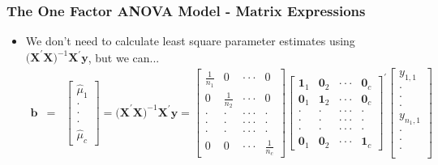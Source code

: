     \begin{frame}[shrink=10]
 \frametitle{The One Factor ANOVA Model - Matrix Expressions}
   \begin{itemize}
    \item We don't need to calculate least square parameter
    estimates using $\mathbf{(X}^{\prime }\mathbf{X)}^{-1}\mathbf{X}^{\prime
    }\mathbf{y}$, but we can...
\begin{eqnarray*}
\mathbf{b} &=&%
\begin{bmatrix}
\hat{\mu}_{1} \\
\cdot  \\
\cdot  \\
\cdot  \\
\hat{\mu}_{c}%
\end{bmatrix}%
=\mathbf{(X}^{\prime }\mathbf{X)}^{-1}\mathbf{X}^{\prime }\mathbf{y}=%
\begin{bmatrix}
\frac{1}{n_1} & 0 & \cdot \cdot \cdot  & 0 \\
0 & \frac{1}{n_2} & \cdot \cdot \cdot  & 0 \\
\cdot  & \cdot  & \cdot \cdot \cdot  & \cdot  \\
\cdot  & \cdot  & \cdot \cdot \cdot  & \cdot  \\
\cdot  & \cdot  & \cdot \cdot \cdot  & \cdot  \\
0 & 0 & \cdot \cdot \cdot  & \frac{1}{n_c}
\end{bmatrix}
\begin{bmatrix}
\mathbf{1}_1 & \mathbf{0}_2 & \cdot \cdot \cdot  & \mathbf{0}_c \\
\mathbf{0}_1 & \mathbf{1}_2 & \cdot \cdot \cdot  & \mathbf{0}_c \\
\cdot  & \cdot  & \cdot \cdot \cdot  & \cdot  \\
\cdot  & \cdot  & \cdot \cdot \cdot  & \cdot  \\
\cdot  & \cdot  & \cdot \cdot \cdot  & \cdot  \\
\mathbf{0}_{1} & \mathbf{0}_{2} & \cdot \cdot \cdot  & \mathbf{1}_c%
\end{bmatrix} ^{\prime }
\begin{bmatrix}
y_{1,1} \\
\cdot  \\
\cdot  \\
\cdot  \\
y_{n_{1},1} \\
\cdot  \\
\cdot  \\
\cdot  \\

\end{bmatrix}
\end{eqnarray*}
\end{itemize}
\end{frame}
